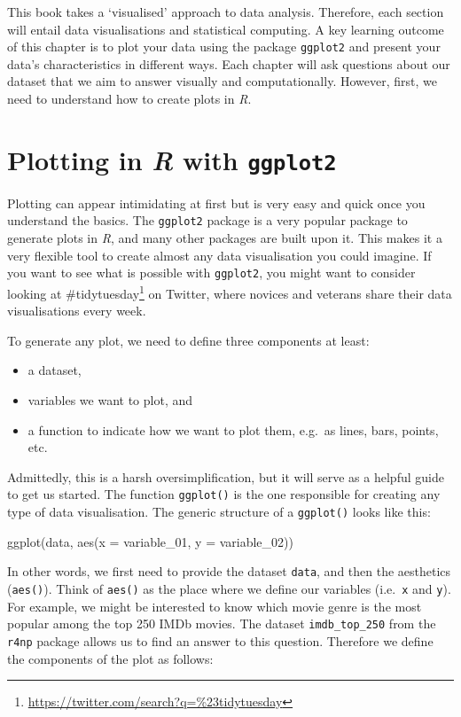 \documentclass[
  letterpaper,
]{krantz}
\renewcommand{\href}[2]{#2\footnote{\url{#1}}}
\begin{document}
This book takes a `visualised' approach to data analysis. Therefore,
each section will entail data visualisations and statistical computing.
A key learning outcome of this chapter is to plot your data using the
package \texttt{ggplot2} and present your data's characteristics in
different ways. Each chapter will ask questions about our dataset that
we aim to answer visually and computationally. However, first, we need
to understand how to create plots in \emph{R}.

\section{\texorpdfstring{Plotting in \emph{R} with
\texttt{ggplot2}}{Plotting in R with ggplot2}}\label{plotting-in-r-with-ggplot2}

Plotting can appear intimidating at first but is very easy and quick
once you understand the basics. The \texttt{ggplot2} package is a very
popular package to generate plots in \emph{R}, and many other packages
are built upon it. This makes it a very flexible tool to create almost
any data visualisation you could imagine. If you want to see what is
possible with \texttt{ggplot2}, you might want to consider looking at
\href{https://twitter.com/search?q=\%23tidytuesday}{\#tidytuesday} on
Twitter, where novices and veterans share their data visualisations
every week.

To generate any plot, we need to define three components at least:

\begin{itemize}
\item
  a dataset,
\item
  variables we want to plot, and
\item
  a function to indicate how we want to plot them, e.g.~as lines, bars,
  points, etc.
\end{itemize}

Admittedly, this is a harsh oversimplification, but it will serve as a
helpful guide to get us started. The function \texttt{ggplot()} is the
one responsible for creating any type of data visualisation. The generic
structure of a \texttt{ggplot()} looks like this:

\label{basic_ggplot_structure}
ggplot(data, aes(x = variable\_01, y = variable\_02))

In other words, we first need to provide the dataset \texttt{data}, and
then the aesthetics (\texttt{aes()}). Think of \texttt{aes()} as the
place where we define our variables (i.e.~\texttt{x} and \texttt{y}).
For example, we might be interested to know which movie genre is the
most popular among the top 250 IMDb movies. The dataset
\texttt{imdb\_top\_250} from the \texttt{r4np} package allows us to find
an answer to this question. Therefore we define the components of the
plot as follows:
\end{document}
